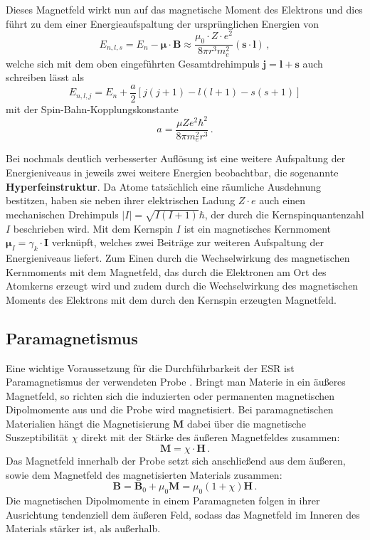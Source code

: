 \documentclass{scrartcl}
\begin{document}
Dieses Magnetfeld wirkt nun auf das magnetische Moment des Elektrons und dies führt zu dem einer Energieaufspaltung der ursprünglichen Energien von
\begin{equation}
    E_{n,l,s} = E_n - \pmb{\mu} \cdot \mathbf{B} \approx \frac{\mu_0 \cdot Z \cdot e^2}{8 \pi r^3 m_e^2} (\mathbf{s} \cdot \mathbf{l}) \, ,
\end{equation}
welche sich mit dem oben eingeführten Gesamtdrehimpuls $\mathbf{j} = \mathbf{l} + \mathbf{s}$ auch schreiben lässt als \\
\begin{equation}
    E_{n,l,j} = E_n + \frac{a}{2}[j(j+1) - l(l+1) - s(s+1) ]
\end{equation}
mit der Spin-Bahn-Kopplungskonstante
\begin{equation}
    a = \frac{\mu Z e^2 \hbar^2}{8 \pi m_e^2 r^3} \, .
\end{equation}

Bei nochmals deutlich verbesserter Auflösung ist eine weitere Aufspaltung der Energieniveaus in jeweils zwei weitere Energien beobachtbar, die sogenannte \textbf{Hyperfeinstruktur}. Da Atome tatsächlich eine räumliche Ausdehnung bestitzen, haben sie neben ihrer elektrischen Ladung $Z \cdot e$ auch einen mechanischen Drehimpuls $|I| = \sqrt{I(I+1)} \hbar$, der durch die Kernspinquantenzahl $I$ beschrieben wird. Mit dem Kernspin $I$ ist ein magnetisches Kernmoment $\pmb{\mu}_I = \gamma_k \cdot \mathbf{I}$ verknüpft, welches zwei Beiträge zur weiteren Aufspaltung der Energieniveaus liefert.
Zum Einen durch die Wechselwirkung des magnetischen Kernmoments mit dem Magnetfeld, das durch die Elektronen am Ort des Atomkerns erzeugt wird und zudem durch die Wechselwirkung des magnetischen Moments des Elektrons mit dem durch den Kernspin erzeugten Magnetfeld.

\subsection{Paramagnetismus}
Eine wichtige Voraussetzung für die Durchführbarkeit der ESR ist Paramagnetismus der verwendeten Probe \cite{Grundlagen}. Bringt man Materie in ein äußeres Magnetfeld, so richten sich die induzierten oder permanenten magnetischen Dipolmomente aus und die Probe wird magnetisiert. Bei paramagnetischen Materialien hängt die Magnetisierung $\mathbf{M}$ dabei über die magnetische Suszeptibilität $\chi$ direkt mit der Stärke des äußeren Magnetfeldes zusammen:
\begin{equation}
    \mathbf{M} = \chi \cdot \mathbf{H}\, .
\end{equation}
Das Magnetfeld innerhalb der Probe setzt sich anschließend aus dem äußeren, sowie dem Magnetfeld des magnetisierten Materials zusammen:
\begin{equation}
    \mathbf{B} = \mathbf{B}_0 + \mu_0\mathbf{M} = \mu_0 (1 + \chi) \mathbf{H} \, .
\end{equation}
Die magnetischen Dipolmomente in einem Paramagneten folgen in ihrer Ausrichtung tendenziell dem äußeren Feld, sodass das Magnetfeld im Inneren des Materials stärker ist, als außerhalb.
\end{document}
